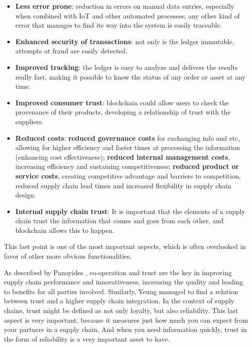 \begin{itemize}
\item \textbf{Less error prone}: reduction in errors on manual data entries, especially when combined with IoT and other automated processes; any other kind of error that manages to find its way into the system is easily traceable.
\item \textbf{Enhanced security of transactions}: not only is the ledger immutable, attempts at fraud are easily detected.
\item \textbf{Improved tracking}: the ledger is easy to analyze and delivers the results really fast, making it possible to know the status of any order or asset at any time.
\item \textbf{Improved consumer trust}: blockchain could allow users to check the provenance of their products, developing a relationship of trust with the suppliers.
\item \textbf{Reduced costs}: \textbf{reduced governance costs} for exchanging info and etc, allowing for higher efficiency and faster times at processing the information (enhancing cost effectiveness); \textbf{reduced internal management costs}, increasing efficiency and sustaining competitiveness; \textbf{reduced product or service costs}, creating competitive advantage and barriers to competition, reduced supply chain lead times and increased flexibility in supply chain design. %
\item \textbf{Internal supply chain trust}: It is important that the elements of a supply chain trust the information that comes and goes from each other, and blockchain allows this to happen.

\end{itemize}


This last point is one of the most important aspects, which is often overlooked in favor of other more obvious functionalities.

As described by Panayides \cite{Panayides2009}, co-operation and trust are the key in improving supply chain performance and innovativeness, increasing the quality and leading to benefits for all parties involved. Similarly, Yeung \cite{Yeung2009} managed to find a relation between trust and a higher supply chain integration. In the context of supply chains, trust might be defined as not only loyalty, but also reliability. This last aspect is very important, because it measures just how much you can expect from your partners in a supply chain. And when you need information quickly, trust in the form of reliability is a very important asset to have.

